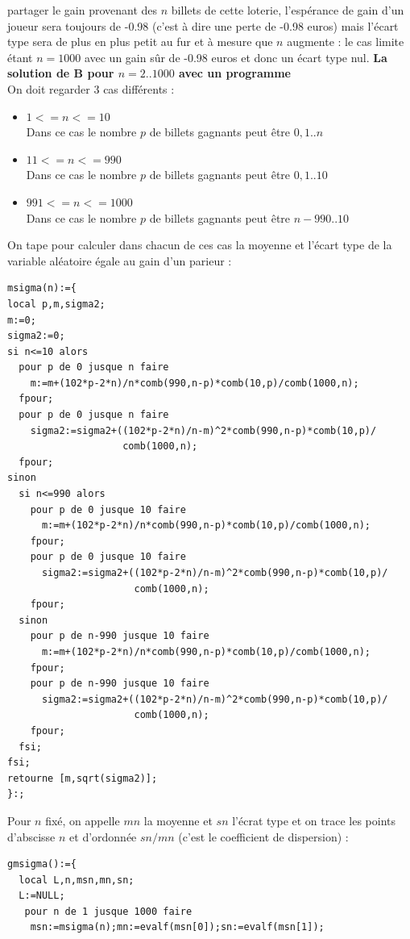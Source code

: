 \documentclass[a4paper,11pt]{book}
\begin{document}
\begin{enumerate}
partager le gain provenant des $n$ billets de cette loterie, l'esp\'erance de 
gain d'un joueur sera toujours de -0.98 (c'est \`a dire une perte de -0.98 
euros) mais l'\'ecart type sera de plus en plus petit au fur et \`a mesure que 
$n$ augmente : le cas limite \'etant $n=1000$ avec un gain s\^ur de -0.98 euros
et donc un \'ecart type nul.
{\bf  La solution de B pour $n=2..1000$ avec un programme}\\
On doit regarder 3 cas diff\'erents :
\begin{itemize}
\item $1<=n<=10$\\
Dans ce cas le nombre $p$ de billets gagnants peut \^etre $0,1..n$
\item $11<=n<=990$\\
Dans ce cas le nombre $p$ de billets gagnants peut \^etre $0,1..10$
\item $991<=n<=1000$\\
Dans ce cas le nombre $p$ de billets gagnants peut \^etre $n-990..10$
\end{itemize}
On tape pour calculer dans chacun de ces cas la moyenne et l'\'ecart type de la 
variable al\'eatoire \'egale au gain d'un parieur :\\
\begin{verbatim}
msigma(n):={
local p,m,sigma2;
m:=0;
sigma2:=0;
si n<=10 alors 
  pour p de 0 jusque n faire
    m:=m+(102*p-2*n)/n*comb(990,n-p)*comb(10,p)/comb(1000,n);
  fpour;
  pour p de 0 jusque n faire
    sigma2:=sigma2+((102*p-2*n)/n-m)^2*comb(990,n-p)*comb(10,p)/
                    comb(1000,n);
  fpour;
sinon
  si n<=990 alors 
    pour p de 0 jusque 10 faire
      m:=m+(102*p-2*n)/n*comb(990,n-p)*comb(10,p)/comb(1000,n);
    fpour;
    pour p de 0 jusque 10 faire
      sigma2:=sigma2+((102*p-2*n)/n-m)^2*comb(990,n-p)*comb(10,p)/
                      comb(1000,n);
    fpour;
  sinon
    pour p de n-990 jusque 10 faire
      m:=m+(102*p-2*n)/n*comb(990,n-p)*comb(10,p)/comb(1000,n);
    fpour;
    pour p de n-990 jusque 10 faire
      sigma2:=sigma2+((102*p-2*n)/n-m)^2*comb(990,n-p)*comb(10,p)/
                      comb(1000,n);
    fpour;
  fsi;
fsi;
retourne [m,sqrt(sigma2)];
}:;
\end{verbatim}
Pour $n$ fix\'e, on appelle $mn$ la moyenne et $sn$ l'\'ecrat type et on trace 
les points d'abscisse $n$ et d'ordonn\'ee $sn/mn$ (c'est le coefficient de 
dispersion) :
\begin{verbatim}
gmsigma():={
  local L,n,msn,mn,sn;
  L:=NULL;
   pour n de 1 jusque 1000 faire
    msn:=msigma(n);mn:=evalf(msn[0]);sn:=evalf(msn[1]);

\end{verbatim}
\end{enumerate}
\end{document}
